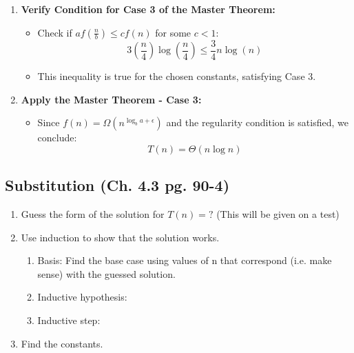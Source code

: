 \begin{example}
\begin{enumerate}
            \item \textbf{Verify Condition for Case 3 of the Master Theorem:}
            \begin{itemize}
                \item Check if \( af\left(\frac{n}{b}\right) \leq cf(n) \) for some \( c < 1 \):
                \[
                3 \left(\frac{n}{4}\right) \log\left(\frac{n}{4}\right) \leq \frac{3}{4} n \log(n)
                \]
                \item This inequality is true for the chosen constants, satisfying Case 3.
            \end{itemize}
            
            \item \textbf{Apply the Master Theorem - Case 3:}
            \begin{itemize}
                \item Since \( f(n) = \Omega\left(n^{\log_b a + \epsilon}\right) \) and the regularity condition is satisfied, we conclude:
                \[
                T(n) = \Theta(n \log n)
                \]
            \end{itemize}
        \end{enumerate}
    \end{example}

\subsection{Substitution (Ch. 4.3 pg. 90-4)}
    \begin{process}
        \begin{enumerate}
            \item Guess the form of the solution for $T(n)=?$ (This will be given on a test)
            \item Use induction to show that the solution works.
            \begin{enumerate}
                \item Basis: Find the base case using values of n that correspond (i.e. make sense) with the guessed solution.
                \item Inductive hypothesis:
                \item Inductive step:
            \end{enumerate}
            \item Find the constants.
        \end{enumerate}
    \end{process}
    
